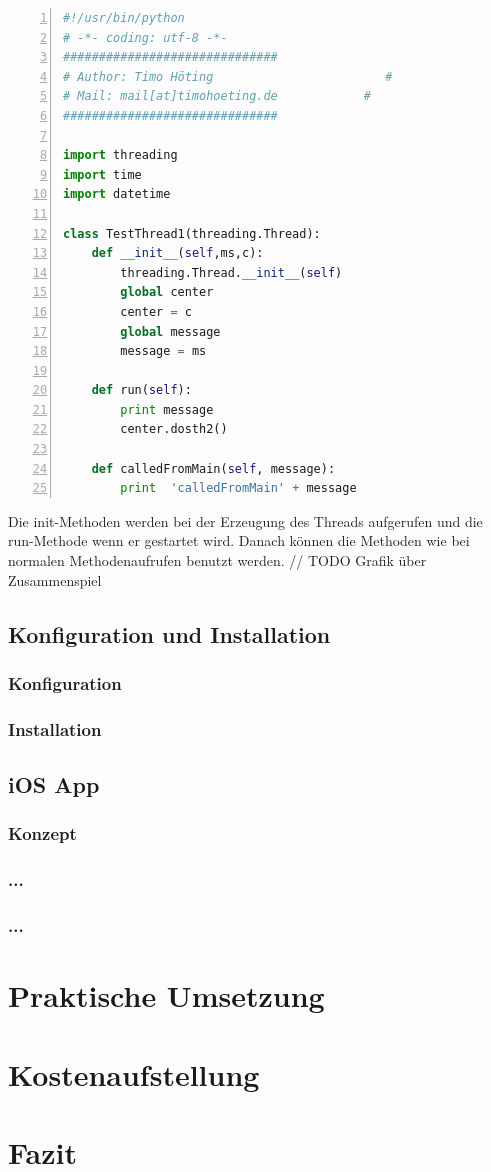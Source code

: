 \begin{lstlisting}[caption=Klasse TestThread1, language=python, frame=single, breaklines=true,columns=fullflexible, commentstyle=\color{gray}\upshape, captionpos=b, numbers = left]
#!/usr/bin/python
# -*- coding: utf-8 -*-
##############################
# Author: Timo Höting                        #
# Mail: mail[at]timohoeting.de            #
##############################

import threading
import time
import datetime

class TestThread1(threading.Thread):
    def __init__(self,ms,c):
        threading.Thread.__init__(self)
        global center
        center = c
        global message
        message = ms

    def run(self):
        print message
        center.dosth2()

    def calledFromMain(self, message):
        print  'calledFromMain' + message
\end{lstlisting}
Die init-Methoden werden bei der Erzeugung des Threads aufgerufen und die run-Methode wenn er gestartet wird. Danach können die Methoden wie bei normalen Methodenaufrufen benutzt werden. 
// TODO Grafik über Zusammenspiel
\section{Konfiguration und Installation}
\subsection{Konfiguration}
\subsection{Installation}

\section{iOS App}
\subsection{Konzept}
\subsection{...}
\subsection{...}

\chapter{Praktische Umsetzung}

\chapter{Kostenaufstellung}

\chapter{Fazit}



 

 